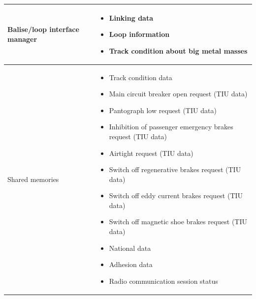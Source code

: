 \documentclass[nocc]{template/openetcs_report}
\begin{document}
\begin{longtable}{|l|l|}
				\hline
																	
					\begin{minipage}[t]{0.35\linewidth} Balise/loop interface manager	\end{minipage} 
				&	\begin{minipage}[t]{0.65\linewidth}
						\begin{itemize}
							\item Linking data
							\item Loop information
							\item Track condition about big metal masses
						\end{itemize}			
					\end{minipage} \\
				
				\hline
																																									
					\begin{minipage}[t]{0.35\linewidth} Shared memories	\end{minipage} 
				&	\begin{minipage}[t]{0.65\linewidth}
						\begin{itemize}
							\item Track condition data
							\item Main circuit breaker open request (TIU data)
							\item Pantograph low request (TIU data)
							\item Inhibition of passenger emergency brakes request (TIU data)
							\item Airtight request (TIU data)
							\item Switch off regenerative brakes request (TIU data)
							\item Switch off eddy current brakes request (TIU data)
							\item Switch off magnetic shoe brakes request (TIU data)
							\item National data
							\item Adhesion data
							\item Radio communication session status
						\end{itemize}				
					\end{minipage} \\
				
				\hline	
			\end{longtable}
\newpage				
\end{document}
